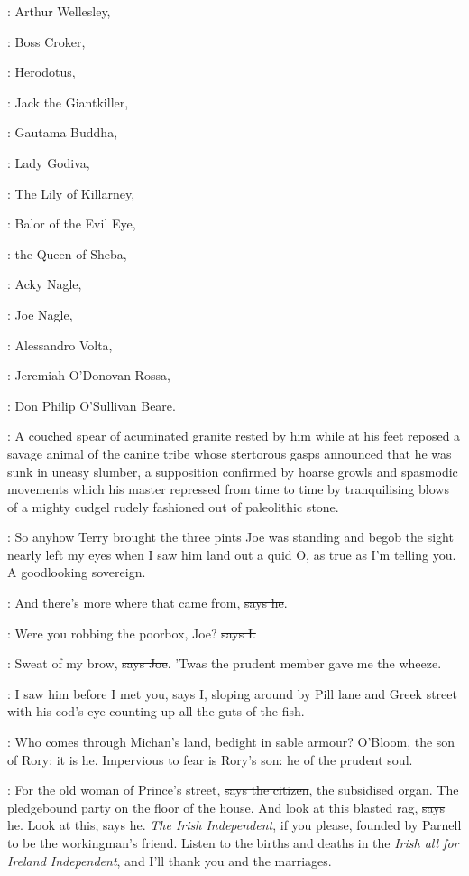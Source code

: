 :
Arthur Wellesley,

:
Boss Croker,

:
Herodotus,

:
Jack the Giantkiller,

:
Gautama Buddha,

:
Lady Godiva,

:
The Lily of Killarney,

:
Balor of the Evil Eye,

:
the Queen of Sheba,

:
Acky Nagle,

:
Joe Nagle,

:
Alessandro Volta,

:
Jeremiah O'Donovan Rossa,

:
Don Philip O'Sullivan Beare.

:
A couched spear of acuminated granite rested by him while at his feet
reposed a savage animal of the canine tribe whose stertorous gasps
announced that he was sunk in uneasy slumber, a supposition confirmed by
hoarse growls and spasmodic movements which his master repressed from time
to time by tranquilising blows of a mighty cudgel rudely fashioned out of
paleolithic stone.

\Nq:
So anyhow Terry brought the three pints Joe was standing and begob
the sight nearly left my eyes when I saw him land out a quid O, as true as
I'm telling you. A goodlooking sovereign.

\joe:
And there's more where that came from, \sout{says he}.

:
Were you robbing the poorbox, Joe? \sout{says I.}

\joe:
Sweat of my brow, \sout{says Joe}.
'Twas the prudent member gave me the wheeze.

:
I saw him before I met you, \sout{says I},
sloping around by Pill lane and
Greek street with his cod's eye counting up all the guts of the fish.

:
Who comes through Michan's land, bedight in sable armour? O'Bloom,
the son of Rory: it is he. Impervious to fear is Rory's son: he
of the prudent soul.

\citizen:
For the old woman of Prince's street,
\sout{says the citizen}, the subsidised
organ. The pledgebound party on the floor of the house. And look at this
blasted rag, \sout{says he}. Look at this, \sout{says he}.
\emph{The Irish Independent}, if you
please, founded by Parnell to be the workingman's friend. Listen to the
births and deaths in the \emph{Irish all for Ireland Independent}, and I'll thank
you and the marriages.


